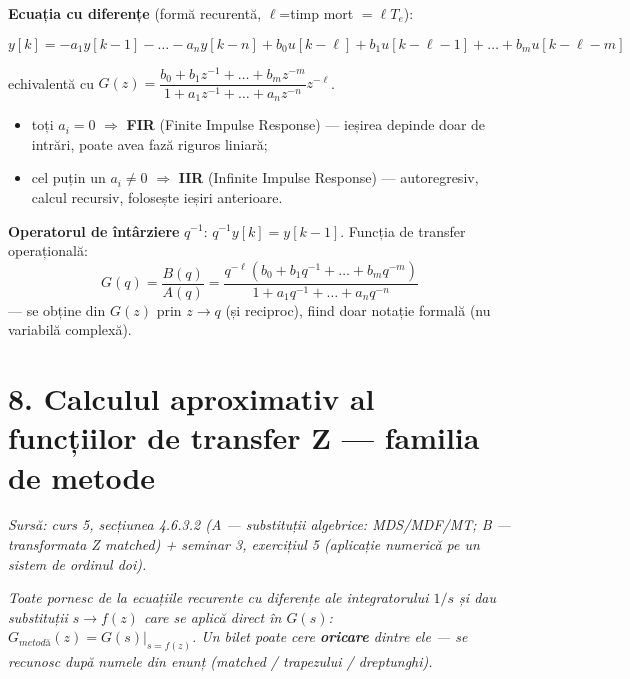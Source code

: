 \documentclass[10pt,a4paper]{article}
\newcommand{\srcnote}[1]{{\footnotesize\color{gray!55!black}\textit{Sursă: #1}}\par}
\begin{document}
\textbf{Ecuația cu diferențe} (formă recurentă, $\ell$=timp mort $=\ell T_e$):
\begin{keyeq}\color{red!65!black}
$$y[k]=-a_1y[k-1]-\dots-a_ny[k-n]+b_0u[k-\ell]+b_1u[k-\ell-1]+\dots+b_mu[k-\ell-m]$$
\end{keyeq}
echivalentă cu $G(z)=\dfrac{b_0+b_1z^{-1}+\dots+b_mz^{-m}}{1+a_1z^{-1}+\dots+a_nz^{-n}}z^{-\ell}$.
\begin{itemize}
\item toți $a_i=0$ $\Rightarrow$ \textbf{FIR} (Finite Impulse Response) — ieșirea depinde doar de intrări, poate avea fază riguros liniară;
\item cel puțin un $a_i\ne0$ $\Rightarrow$ \textbf{IIR} (Infinite Impulse Response) — autoregresiv, calcul recursiv, folosește ieșiri anterioare.
\end{itemize}
\textbf{Operatorul de întârziere} $q^{-1}$: $q^{-1}y[k]=y[k-1]$. Funcția de transfer operațională:
$$G(q)=\dfrac{B(q)}{A(q)}=\dfrac{q^{-\ell}(b_0+b_1q^{-1}+\dots+b_mq^{-m})}{1+a_1q^{-1}+\dots+a_nq^{-n}}$$
— se obține din $G(z)$ prin $z\to q$ (și reciproc), fiind doar notație formală (nu variabilă complexă).

\section*{8. Calculul aproximativ al funcțiilor de transfer Z — familia de metode}\label{sec:8}
\srcnote{curs 5, secțiunea 4.6.3.2 (A — substituții algebrice: MDS/MDF/MT; B — transformata Z matched) + seminar 3, exercițiul 5 (aplicație numerică pe un sistem de ordinul doi).}
\textit{Toate pornesc de la ecuațiile recurente cu diferențe ale integratorului $1/s$ și dau substituții $s\to f(z)$ care se aplică direct în $G(s)$: $G_{metodă}(z)=G(s)|_{s=f(z)}$. Un bilet poate cere \textbf{oricare} dintre ele — se recunosc după numele din enunț (matched / trapezului / dreptunghi).}
\end{document}
